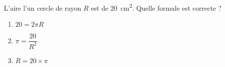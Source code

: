 
\begin{mental}
L'aire l'un cercle de rayon \( R\) est de \SI{20}{\centi\meter\squared}. Quelle formule est correcte ?
\begin{enumerate}
    \item
        \( 20=2\pi R\)
    \item
        \( \pi=\dfrac{ 20 }{ R^2 }\)
    \item
        \( R=20\times \pi\)
\end{enumerate}
\end{mental}
